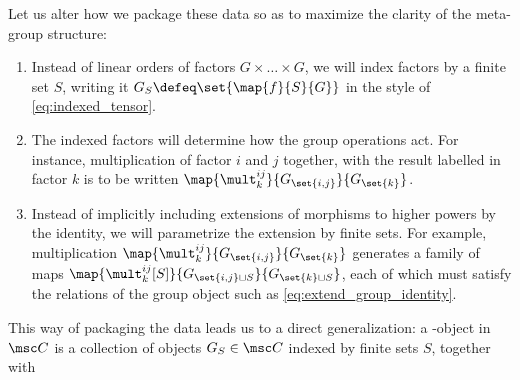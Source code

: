 Let us alter how we package these data so as to maximize the clarity of the
meta-group structure:
\begin{enumerate}
        \item Instead of linear orders of factors $G \times \dots \times G$, we
                will index factors by a finite set $S$, writing it $G_S \defeq
                \set{\map {f} {S} {G}}$ in the style of
                \cref{eq:indexed_tensor}.
        \item The indexed factors will determine how the group operations act.
                For instance, multiplication of factor $i$ and $j$ together,
                with the result labelled in factor $k$ is to be written
                $\map {\mult^{ij}_{k}} {G_{\set{i,j}}} {G_{\set{k}}}$.
        \item Instead of implicitly including extensions of morphisms to higher
                powers by the identity, we will parametrize the extension by
                finite sets. For example, multiplication $\map {\mult^{ij}_{k}}
                {G_{\set{i,j}}} {G_{\set{k}}}$ generates a family of maps
                $\map {\mult^{ij}_k[S]} {G_{\set{i,j}\sqcup S}}
                {G_{\set{k}\sqcup S}}$, each of which must satisfy the relations
                of the group object such as \cref{eq:extend_group_identity}.
\end{enumerate}
This way of packaging the data leads us to a direct generalization: a
-object in $\CC$ is a collection of objects $G_S\in \CC$
indexed by finite sets $S$, together with 
